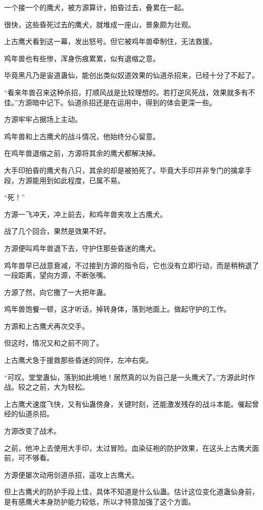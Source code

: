 \begin{this_body}
一个接一个的鹰犬，被方源算计，拍昏过去，叠累在一起。

很快，这些昏死过去的鹰犬，就堆成一座山，景象颇为壮观。

上古鹰犬看到这一幕，发出怒号。但它被鸡年兽牵制住，无法救援。

鸡年兽也有些惨，浑身伤痕累累，似有退缩之意。

毕竟黑凡乃是宙道蛊仙，能创出类似奴道效果的仙道杀招来，已经十分了不起了。

“看来年兽召来这种杀招，打顺风战是比较理想的。若打逆风死战，效果就多有不佳。”方源暗中记下。仙道杀招还是在运用中，得到的体会更深一些。

方源牢牢占据场上主动。

鸡年兽和上古鹰犬的战斗情况，他始终分心留意。

在鸡年兽退缩之前，方源将其余的鹰犬都解决掉。

大手印拍昏的鹰犬有八只，其余的却是被拍死了。毕竟大手印并非专门的擒拿手段，方源能用到如此程度，已属不易。

“死！”

方源一飞冲天，冲上前去，和鸡年兽夹攻上古鹰犬。

战了几个回合，果然是效果不好。

方源便叫鸡年兽退下去，守护住那些昏迷的鹰犬。

鸡年兽早已战意衰减，不过接到方源的指令后，它也没有立即行动，而是稍稍退了一段距离，望向方源，不断张嘴。

方源了然，向它撒了一大把年蛊。

鸡年兽饱餐一顿，这才听话，掉转身体，落到地面上。做起守护的工作。

方源和上古鹰犬再次交手。

但这时，情况又和之前不同了。

上古鹰犬急于援救那些昏迷的同伴，左冲右突。

“可叹。堂堂蛊仙，落到如此境地！居然真的以为自己是一头鹰犬了。”方源此时作战。较之之前，大为轻松。

上古鹰犬速度飞快，又有仙蛊傍身，关键时刻，还能激发残存的战斗本能。催起曾经的仙道杀招。

方源改变了战术。

之前，他冲上去使用大手印，太过冒险。血染征袍的防护效果，在这头上古鹰犬面前，可不够看。

方源便屡次动用剑道杀招，遥攻上古鹰犬。

但上古鹰犬的防护手段上佳，具体不知道是什么仙蛊。估计这位变化道蛊仙身前，是有感鹰犬本身防护能力较低，所以才特意加强了这个方面。


\end{this_body}

